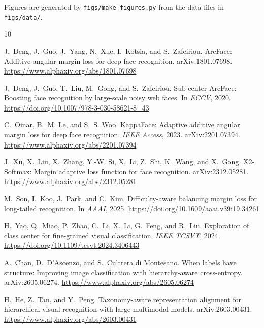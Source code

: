 \documentclass[11pt]{article}
\begin{document}
Figures are generated by \nolinkurl{figs/make_figures.py} from the data files in
\nolinkurl{figs/data/}.

\begin{thebibliography}{10}

J.~Deng, J.~Guo, J.~Yang, N.~Xue, I.~Kotsia, and S.~Zafeiriou.
\newblock ArcFace: Additive angular margin loss for deep face recognition.
\newblock arXiv:1801.07698.
\newblock \url{https://www.alphaxiv.org/abs/1801.07698}

J.~Deng, J.~Guo, T.~Liu, M.~Gong, and S.~Zafeiriou.
\newblock Sub-center ArcFace: Boosting face recognition by large-scale noisy web
  faces.
\newblock In \emph{ECCV}, 2020.
\newblock \url{https://doi.org/10.1007/978-3-030-58621-8_43}

C.~Oinar, B.~M. Le, and S.~S. Woo.
\newblock KappaFace: Adaptive additive angular margin loss for deep face
  recognition.
\newblock \emph{IEEE Access}, 2023. arXiv:2201.07394.
\newblock \url{https://www.alphaxiv.org/abs/2201.07394}

J.~Xu, X.~Liu, X.~Zhang, Y.-W. Si, X.~Li, Z.~Shi, K.~Wang, and X.~Gong.
\newblock X2-Softmax: Margin adaptive loss function for face recognition.
\newblock arXiv:2312.05281.
\newblock \url{https://www.alphaxiv.org/abs/2312.05281}

M.~Son, I.~Koo, J.~Park, and C.~Kim.
\newblock Difficulty-aware balancing margin loss for long-tailed recognition.
\newblock In \emph{AAAI}, 2025.
\newblock \url{https://doi.org/10.1609/aaai.v39i19.34261}

H.~Yao, Q.~Miao, P.~Zhao, C.~Li, X.~Li, G.~Feng, and R.~Liu.
\newblock Exploration of class center for fine-grained visual classification.
\newblock \emph{IEEE TCSVT}, 2024.
\newblock \url{https://doi.org/10.1109/tcsvt.2024.3406443}

A.~Chan, D.~D'Ascenzo, and S.~Cultrera di Montesano.
\newblock When labels have structure: Improving image classification with
  hierarchy-aware cross-entropy.
\newblock arXiv:2605.06274.
\newblock \url{https://www.alphaxiv.org/abs/2605.06274}

H.~He, Z.~Tan, and Y.~Peng.
\newblock Taxonomy-aware representation alignment for hierarchical visual
  recognition with large multimodal models.
\newblock arXiv:2603.00431.
\newblock \url{https://www.alphaxiv.org/abs/2603.00431}


\end{thebibliography}
\end{document}
